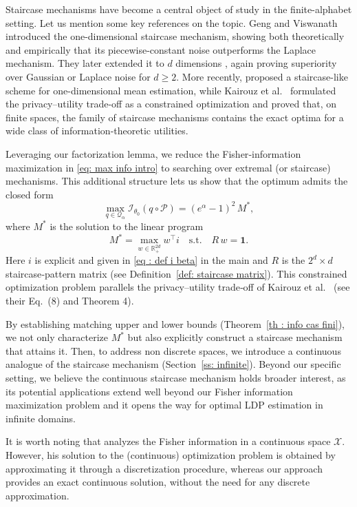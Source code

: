 \documentclass[a4paper, 11pt]{article}
\theoremstyle{definition}
\begin{document}
{Staircase mechanisms have become a central object of study in the finite-alphabet setting. Let us mention some key references on the topic. Geng and Viswanath \cite{GenVis12} introduced the one-dimensional staircase mechanism, showing both theoretically and empirically that its piecewise-constant noise outperforms the Laplace mechanism. They later extended it to \(d\) dimensions \cite{Gen15}, again proving superiority over Gaussian or Laplace noise for \(d\ge2\). More recently, \cite{Kul23} proposed a staircase-like scheme for one-dimensional mean estimation, while Kairouz et al.\ \cite{kairouzExtremalMechanismsLocal2015} formulated the privacy–utility trade-off as a constrained optimization and proved that, on finite spaces, the family of staircase mechanisms contains the exact optima for a wide class of information-theoretic utilities.

Leveraging our factorization lemma, we reduce the Fisher‐information maximization in \eqref{eq: max info intro} to searching over extremal (or staircase) mechanisms.  This additional structure lets us show that the optimum admits the closed form
\[
\max_{q\in\mathcal{Q}_\alpha}\mathcal{I}_{\theta_0}(q\circ\mathcal{P})
=(e^\alpha -1)^2\,M^*,
\]
where \(M^*\) is the solution to the linear program
\begin{equation*}
M^*=\max_{w\in\mathbb{R}_+^{2d}}w^\top i
\quad\text{s.t.}\quad R\,w=\mathbf1.
\end{equation*}
Here \(i\) is explicit and given in \eqref{eq : def i beta} in the main and \(R\) is the \(2^d\times d\) staircase‐pattern matrix (see Definition~\ref{def: staircase matrix}). This constrained optimization problem parallels the privacy–utility trade‐off of Kairouz et al.\ \cite{kairouzExtremalMechanismsLocal2015} (see their Eq.~(8) and Theorem 4). 

By establishing matching upper and lower bounds (Theorem~\ref{th : info cas fini}), we not only characterize \(M^*\) but also explicitly construct a staircase mechanism that attains it. Then, to address non discrete spaces,
we introduce a continuous analogue of the staircase mechanism (Section~\ref{ss: infinite}). Beyond our specific setting, we believe the continuous staircase mechanism holds broader interest, as its potential applications extend well beyond our Fisher information maximization problem and it opens the way for optimal LDP estimation in infinite domains. 



 It is worth noting that  
 \cite{KalSte} analyzes the Fisher information in a continuous space \(\mathcal{X}\). However, his solution to the (continuous) optimization problem is obtained by approximating it through a discretization procedure, whereas our approach provides an exact continuous solution, without the need for any discrete approximation.

}
\end{document}
